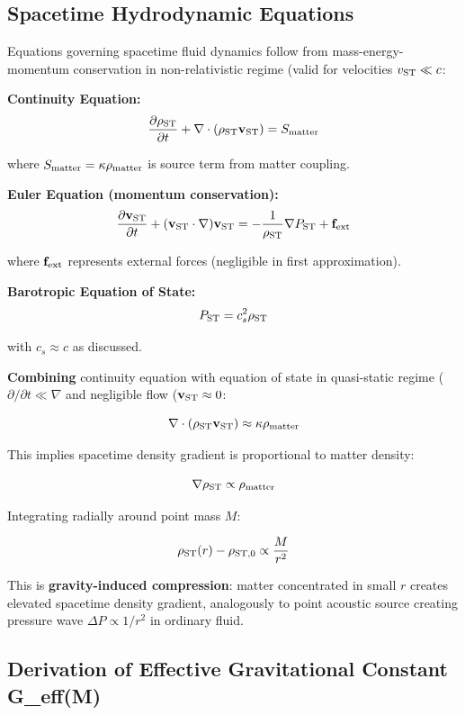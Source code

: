 \documentclass[10pt,a4paper]{article}
\begin{document}
\subsection{Spacetime Hydrodynamic
Equations}\label{spacetime-hydrodynamic-equations}

Equations governing spacetime fluid dynamics follow from
mass-energy-momentum conservation in non-relativistic regime (valid for
velocities \(v_{\rm ST} \ll c\):

\textbf{Continuity Equation:}
\[\frac{\partial \rho_{\rm ST}}{\partial t} + \nabla \cdot (\rho_{\rm ST} {\bf v}_{\rm ST}) = S_{\rm matter}\]

where \(S_{\rm matter} = \kappa \rho_{\rm matter}\) is source term from
matter coupling.

\textbf{Euler Equation (momentum conservation):}
\[\frac{\partial {\bf v}_{\rm ST}}{\partial t} + ({\bf v}_{\rm ST} \cdot \nabla) {\bf v}_{\rm ST} = -\frac{1}{\rho_{\rm ST}} \nabla P_{\rm ST} + {\bf f}_{\rm ext}\]

where \({\bf f}_{\rm ext}\) represents external forces (negligible in
first approximation).

\textbf{Barotropic Equation of State:}
\[P_{\rm ST} = c_s^2 \rho_{\rm ST}\]

with \(c_s \approx c\) as discussed.

\textbf{Combining} continuity equation with equation of state in
quasi-static regime (\(\partial/\partial t \ll \nabla\) and negligible
flow (\({\bf v}_{\rm ST} \approx 0\):

\[\nabla \cdot (\rho_{\rm ST} {\bf v}_{\rm ST}) \approx \kappa \rho_{\rm matter}\]

This implies spacetime density gradient is proportional to matter
density:

\[\nabla \rho_{\rm ST} \propto \rho_{\rm matter}\]

Integrating radially around point mass \(M\):

\[\rho_{\rm ST}(r) - \rho_{\rm ST,0} \propto \frac{M}{r^2}\]

This is \textbf{gravity-induced compression}: matter concentrated in
small \(r\) creates elevated spacetime density gradient, analogously to
point acoustic source creating pressure wave \(\Delta P \propto 1/r^2\)
in ordinary fluid.

\subsection{Derivation of Effective Gravitational Constant
G\_eff(M)}\label{derivation-of-effective-gravitational-constant-g_effm}
\end{document}
